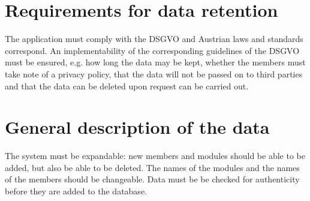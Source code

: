\documentclass{scrreprt}
\begin{document}
\section{Requirements for data retention}
The application must comply with the DSGVO and Austrian laws and standards
correspond. An implementability of the corresponding guidelines of the DSGVO must be ensured, e.g. how long the data may be kept, whether the members
must take note of a privacy policy, that the data will not be passed on to third parties and that the data can be deleted upon request can be carried out.

\section{General description of the data}
The system must be expandable: new members and modules should be able to
be added, but also be able to be deleted. The names
of the modules and the names of the members should be changeable. Data must be
be checked for authenticity before they are added to the database.
\end{document}
